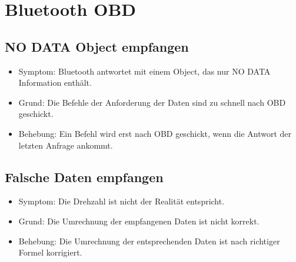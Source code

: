 \documentclass[qualitaetssicherung.tex]{subfiles}
\begin{document}
\section{Bluetooth OBD}

	\subsection{NO DATA Object empfangen}
		\begin{itemize}
			\item
			Symptom: Bluetooth antwortet mit einem Object, das nur NO DATA Information
			enthält.
			\item
			Grund: Die Befehle der Anforderung der Daten sind zu schnell nach OBD
			geschickt.
			\item
			Behebung: Ein Befehl wird erst nach OBD geschickt, wenn die Antwort der
			letzten Anfrage ankommt.
		\end{itemize}
		
	\subsection{Falsche Daten empfangen}
		\begin{itemize}
			\item
			Symptom: Die Drehzahl ist nicht der Realität entspricht.
			\item
			Grund: Die Umrechnung der empfangenen Daten ist nicht korrekt.
			\item
			Behebung: Die Umrechnung der entsprechenden Daten ist nach richtiger Formel
			korrigiert.
		\end{itemize}
		
\end{document}
